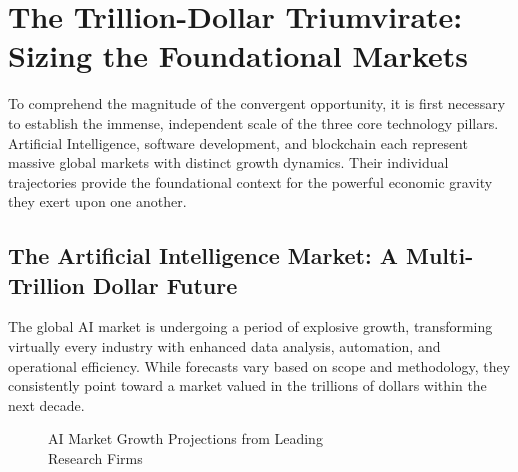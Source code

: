 \documentclass[11pt,a4paper]{report}
\begin{document}
\chapter{The Trillion-Dollar Triumvirate: Sizing the Foundational Markets}

To comprehend the magnitude of the convergent opportunity, it is first necessary to establish the immense, independent scale of the three core technology pillars. Artificial Intelligence, software development, and blockchain each represent massive global markets with distinct growth dynamics. Their individual trajectories provide the foundational context for the powerful economic gravity they exert upon one another.

\section{The Artificial Intelligence Market: A Multi-Trillion Dollar Future}

The global AI market is undergoing a period of explosive growth, transforming virtually every industry with enhanced data analysis, automation, and operational efficiency. While forecasts vary based on scope and methodology, they consistently point toward a market valued in the trillions of dollars within the next decade.

\begin{figure}[H]
\centering
{}
\caption{AI Market Growth Projections from Leading\\Research Firms}
\end{figure}
\end{document}
